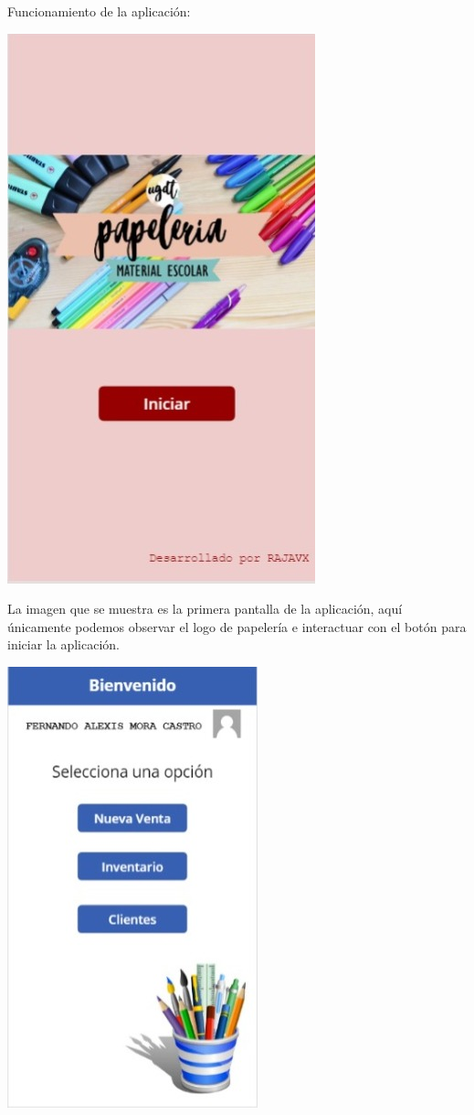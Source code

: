 \documentclass[letter,12pt]{article} %
\begin{document}
\newpage 
Funcionamiento de la aplicación:
\begin{center} 
\includegraphics[scale=0.45]{imagenes/A01.jpeg}
\end{center}
La imagen que se muestra es la primera pantalla de la aplicación, aquí únicamente podemos observar el logo de papelería e interactuar con el botón para iniciar la aplicación.\\
\begin{center} 
\includegraphics[scale=0.45]{imagenes/A02.jpeg}
\end{center} 
\end{document}
